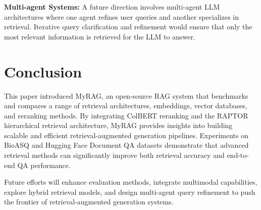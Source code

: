 \documentclass{scrartcl}
\begin{document}
\textbf{Multi-agent Systems:} A future direction involves multi-agent LLM architectures where one agent refines user queries and another specializes in retrieval. Iterative query clarification and refinement would ensure that only the most relevant information is retrieved for the LLM to answer.

\section{Conclusion}

This paper introduced MyRAG, an open-source RAG system that benchmarks and compares a range of retrieval architectures, embeddings, vector databases, and reranking methods. By integrating ColBERT reranking and the RAPTOR hierarchical retrieval architecture, MyRAG provides insights into building scalable and efficient retrieval-augmented generation pipelines. Experiments on BioASQ and Hugging Face Document QA datasets demonstrate that advanced retrieval methods can significantly improve both retrieval accuracy and end-to-end QA performance.

Future efforts will enhance evaluation methods, integrate multimodal capabilities, explore hybrid retrieval models, and design multi-agent query refinement to push the frontier of retrieval-augmented generation systems.




\appendix

\end{document}
